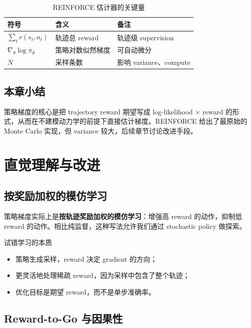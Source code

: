 \documentclass[a4paper]{article}
\begin{document}
\begin{table}[H]
\centering
\small
\begin{tabular}{p{}p{}p{}}
\toprule
符号 & 含义 & 备注 \\
\midrule
$\sum_t r(s_t,a_t)$ & 轨迹总 reward & 轨迹级 supervision \\
$\nabla_\theta \log \pi_\theta$ & 策略对数似然梯度 & 可自动微分 \\
$N$ & 采样条数 & 影响 variance、compute \\
\bottomrule
\end{tabular}
\caption{REINFORCE 估计器的关键量}
\end{table}

\subsection{本章小结}

策略梯度的核心是把 trajectory reward 期望写成 log-likelihood × reward 的形式，从而在不建模动力学的前提下直接估计梯度。REINFORCE 给出了最原始的 Monte Carlo 实现，但 variance 较大，后续章节讨论改进手段。

\section{直觉理解与改进}

\subsection{按奖励加权的模仿学习}

策略梯度实际上是\textbf{按轨迹奖励加权的模仿学习}：增强高 reward 的动作，抑制低 reward 的动作。相比纯监督，这种写法允许我们通过 stochastic policy 做探索。

\begin{knowledgebox}{试错学习的本质}
\begin{itemize}
    \item 策略生成采样，reward 决定 gradient 的方向；
    \item 更灵活地处理稀疏 reward，因为采样中包含了整个轨迹；
    \item 优化目标是期望 reward，而不是单步准确率。
\end{itemize}
\end{knowledgebox}

\subsection{Reward-to-Go 与因果性}
\end{document}

